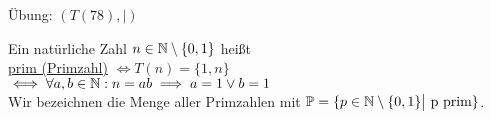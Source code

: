 \documentclass{../../meta/tudscript}
\begin{document}
		Übung: $(T(78),|)$

	Ein natürliche Zahl $n \in \mathbb{N} \setminus \{0,1\}$ heißt \\

	\underline{prim (Primzahl)} $\iff  T(n) = \{1,n\}$\\
	$\iff \forall a,b \in \mathbb{N}: n=ab \implies a = 1 \lor b = 1$\\

	Wir bezeichnen die Menge aller Primzahlen mit $\mathbb{P} = \{p \in \mathbb{N} \setminus \{0,1\} \big| \text{ p prim}\}$.
\end{document}
